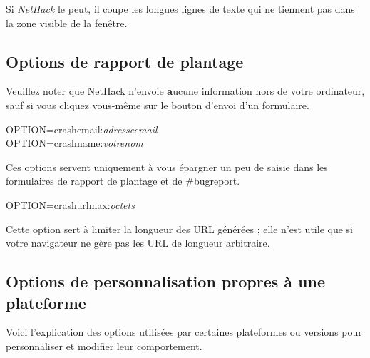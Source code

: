 \documentclass[titlepage]{article}
\begin{document}
\begin{description}[font=\mdseries\itshape]
\item[wraptext]
Si \textit{NetHack} le peut, il coupe les longues lignes de texte qui ne tiennent pas
dans la zone visible de la fenêtre.
\end{description}

\subsection*{Options de rapport de plantage}

Veuillez noter que NetHack n'envoie {\textbf aucune} information hors de votre
ordinateur, sauf si vous cliquez vous-même sur le bouton d'envoi d'un formulaire.
\begin{description}
\item[OPTION=crash\textunderscore email:\textit{adresse\textunderscore email}]
\item[OPTION=crash\textunderscore name:\textit{votre\textunderscore nom}]
\end{description}
Ces options servent uniquement à vous épargner un peu de saisie dans les
formulaires de rapport de plantage et de \#bugreport.
\begin{description}
\item[OPTION=crash\textunderscore urlmax:\textit{octets}]
\end{description}
Cette option sert à limiter la longueur des URL générées ; elle n'est
utile que si votre navigateur ne gère pas les URL de longueur arbitraire.

\subsection*{Options de personnalisation propres à une plateforme}

Voici l'explication des options utilisées par certaines plateformes
ou versions pour personnaliser et modifier leur comportement.
\end{document}
